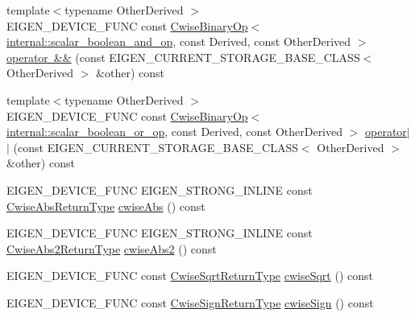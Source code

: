 \begin{DoxyCompactItemize}
\item 
{\footnotesize template$<$typename Other\+Derived $>$ }\\E\+I\+G\+E\+N\+\_\+\+D\+E\+V\+I\+C\+E\+\_\+\+F\+U\+NC const \mbox{\hyperlink{class_eigen_1_1_cwise_binary_op}{Cwise\+Binary\+Op}}$<$ \mbox{\hyperlink{struct_eigen_1_1internal_1_1scalar__boolean__and__op}{internal\+::scalar\+\_\+boolean\+\_\+and\+\_\+op}}, const Derived, const Other\+Derived $>$ \mbox{\hyperlink{class_eigen_1_1_sparse_matrix_base_a80b919642bae921a0603fefefb51eb52}{operator \&\&}} (const E\+I\+G\+E\+N\+\_\+\+C\+U\+R\+R\+E\+N\+T\+\_\+\+S\+T\+O\+R\+A\+G\+E\+\_\+\+B\+A\+S\+E\+\_\+\+C\+L\+A\+SS$<$ Other\+Derived $>$ \&other) const
\item 
{\footnotesize template$<$typename Other\+Derived $>$ }\\E\+I\+G\+E\+N\+\_\+\+D\+E\+V\+I\+C\+E\+\_\+\+F\+U\+NC const \mbox{\hyperlink{class_eigen_1_1_cwise_binary_op}{Cwise\+Binary\+Op}}$<$ \mbox{\hyperlink{struct_eigen_1_1internal_1_1scalar__boolean__or__op}{internal\+::scalar\+\_\+boolean\+\_\+or\+\_\+op}}, const Derived, const Other\+Derived $>$ \mbox{\hyperlink{class_eigen_1_1_sparse_matrix_base_a34225d20887df166fd66c9323fcef379}{operator$\vert$$\vert$}} (const E\+I\+G\+E\+N\+\_\+\+C\+U\+R\+R\+E\+N\+T\+\_\+\+S\+T\+O\+R\+A\+G\+E\+\_\+\+B\+A\+S\+E\+\_\+\+C\+L\+A\+SS$<$ Other\+Derived $>$ \&other) const
\item 
E\+I\+G\+E\+N\+\_\+\+D\+E\+V\+I\+C\+E\+\_\+\+F\+U\+NC E\+I\+G\+E\+N\+\_\+\+S\+T\+R\+O\+N\+G\+\_\+\+I\+N\+L\+I\+NE const \mbox{\hyperlink{class_eigen_1_1_cwise_unary_op}{Cwise\+Abs\+Return\+Type}} \mbox{\hyperlink{class_eigen_1_1_sparse_matrix_base_ae8e39ef24c78084bdaddddad8488e11b}{cwise\+Abs}} () const
\item 
E\+I\+G\+E\+N\+\_\+\+D\+E\+V\+I\+C\+E\+\_\+\+F\+U\+NC E\+I\+G\+E\+N\+\_\+\+S\+T\+R\+O\+N\+G\+\_\+\+I\+N\+L\+I\+NE const \mbox{\hyperlink{class_eigen_1_1_cwise_unary_op}{Cwise\+Abs2\+Return\+Type}} \mbox{\hyperlink{class_eigen_1_1_sparse_matrix_base_a2052c2ae010743f6b76a8da5912350b4}{cwise\+Abs2}} () const
\item 
E\+I\+G\+E\+N\+\_\+\+D\+E\+V\+I\+C\+E\+\_\+\+F\+U\+NC const \mbox{\hyperlink{class_eigen_1_1_cwise_unary_op}{Cwise\+Sqrt\+Return\+Type}} \mbox{\hyperlink{class_eigen_1_1_sparse_matrix_base_aeb61b3c78244395783b29d73cbf5e61d}{cwise\+Sqrt}} () const
\item 
E\+I\+G\+E\+N\+\_\+\+D\+E\+V\+I\+C\+E\+\_\+\+F\+U\+NC const \mbox{\hyperlink{class_eigen_1_1_cwise_unary_op}{Cwise\+Sign\+Return\+Type}} \mbox{\hyperlink{class_eigen_1_1_sparse_matrix_base_a8498baacdc71d7f8b0df4ba0077a6487}{cwise\+Sign}} () const

\end{DoxyCompactItemize}
